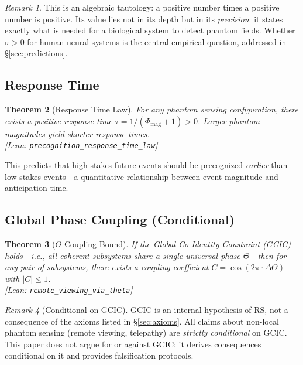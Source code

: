 \documentclass[11pt, a4paper]{article}
\newcommand{\leanref}[1]{\texttt{\small #1}}
\newtheorem{theorem}{Theorem}[section]
\theoremstyle{definition}
\theoremstyle{remark}
\newtheorem{remark}[theorem]{Remark}
\begin{document}
\begin{remark}
This is an algebraic tautology: a positive number times a positive
number is positive. Its value lies not in its depth but in its
\emph{precision}: it states exactly what is needed for a biological
system to detect phantom fields. Whether $\sigma > 0$ for human
neural systems is the central empirical question, addressed in
\S\ref{sec:predictions}.
\end{remark}

\subsection{Response Time}

\begin{theorem}[Response Time Law]\label{thm:response}
For any phantom sensing configuration, there exists a positive
response time $\tau = 1/(\Phi_{\mathrm{mag}} + 1) > 0$.
Larger phantom magnitudes yield shorter response times.\\
\textup{[Lean: \leanref{precognition\_response\_time\_law}]}
\end{theorem}

This predicts that high-stakes future events should be
precognized \emph{earlier} than low-stakes events---a quantitative
relationship between event magnitude and anticipation time.

\subsection{Global Phase Coupling (Conditional)}

\begin{theorem}[$\Theta$-Coupling Bound]\label{thm:theta}
If the Global Co-Identity Constraint (GCIC) holds---i.e., all
coherent subsystems share a single universal phase $\Theta$---then
for any pair of subsystems, there exists a coupling coefficient
$C = \cos(2\pi \cdot \Delta\Theta)$ with $|C| \leq 1$.\\
\textup{[Lean: \leanref{remote\_viewing\_via\_theta}]}
\end{theorem}

\begin{remark}[Conditional on GCIC]
GCIC is an internal hypothesis of RS, not a consequence of the
axioms listed in \S\ref{sec:axioms}. All claims about non-local
phantom sensing (remote viewing, telepathy) are \emph{strictly
conditional} on GCIC. This paper does not argue for or against GCIC;
it derives consequences conditional on it and provides falsification
protocols.
\end{remark}
\end{document}
